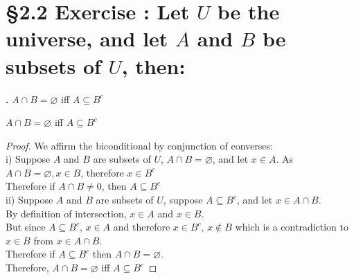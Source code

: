 \documentclass[a4paper,11pt]{article}
\begin{document}
\section*{\S 2.2 Exercise : Let \(U\) be the universe, and let \(A\) and \(B\) be subsets of \(U\), then: }
\textbf{.}
\(A \cap B = \varnothing\) iff \(A \subseteq B^c\)
\begin{theorem5}
\(A \cap B = \varnothing\) iff \(A \subseteq B^c\)
\begin{proof}
We affirm the biconditional by conjunction of converses:\\
i) Suppose \(A\) and \(B\) are subsets of \(U\), \(A \cap B = \varnothing\), and 
let \(x \in A\).
As \(A \cap B = \varnothing, x \in B\), therefore \(x \in B^c\)\\
Therefore if \(A \cap B \neq 0\), then \(A \subseteq B^c\)\\

\noindent ii) Suppose \(A\) and \(B\) are subsets of \(U\), suppose \(A \subseteq 
B^c\), and let \(x \in A \cap B\).\\
By definition of intersection, \(x \in A\) and \(x \in B\).\\
But since \(A \subseteq B^c\), \(x \in A\) and therefore \(x \in B^c\), \(x \notin B\) 
which is a contradiction to \(x \in B\) from \(x \in A \cap B\).\\
Therefore if \(A \subseteq B^c\) then \(A \cap B = \varnothing\).\\

\noindent Therefore, \(A \cap B = \varnothing\) iff \(A \subseteq B^c\)
\end{proof}
\end{theorem5}

\newpage
\setcounter{ProblemCounter}{15}
\setcounter{SubsectionCounter}{1}
\end{document}
